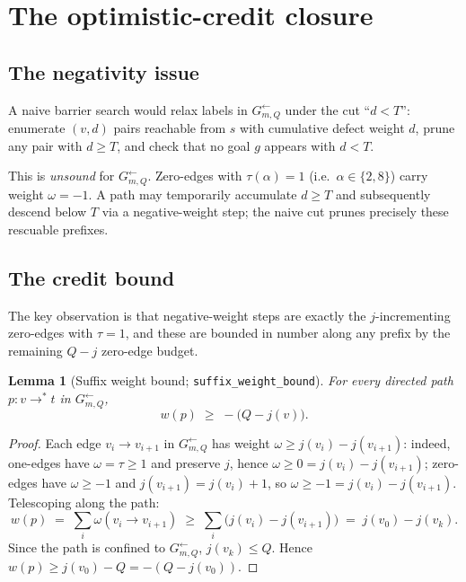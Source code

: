 \documentclass[11pt,a4paper]{article}
\theoremstyle{plain}
\newtheorem{lemma}[theorem]{Lemma}
\theoremstyle{definition}
\newcommand{\InvG}{G^{\!\leftarrow}}
\begin{document}
\section{The optimistic-credit closure}\label{sec:s216-closure}

\subsection{The negativity issue}

A naive barrier search would relax labels in $\InvG_{m, Q}$ under
the cut ``$d < T$'': enumerate $(v, d)$ pairs reachable from $s$
with cumulative defect weight $d$, prune any pair with $d \ge T$,
and check that no goal $g$ appears with $d < T$.

This is \emph{unsound} for $\InvG_{m, Q}$. Zero-edges with
$\tau(\alpha) = 1$ (i.e.\ $\alpha \in \{2, 8\}$) carry weight
$\omega = -1$. A path may temporarily accumulate $d \ge T$ and
subsequently descend below $T$ via a negative-weight step; the
naive cut prunes precisely these rescuable prefixes.

\subsection{The credit bound}

The key observation is that negative-weight steps are exactly the
$j$-incrementing zero-edges with $\tau = 1$, and these are
bounded in number along any prefix by the remaining $Q - j$ zero-edge
budget.

\begin{lemma}[Suffix weight bound; \texttt{suffix\_weight\_bound}]
\label{lem:suffix-bound}
For every directed path $p : v \to^{*} t$ in $\InvG_{m, Q}$,
\[
  w(p) \;\ge\; -\bigl(Q - j(v)\bigr).
\]
\end{lemma}

\begin{proof}
Each edge $v_i \to v_{i+1}$ in $\InvG_{m, Q}$ has weight
$\omega \ge j(v_i) - j(v_{i+1})$: indeed, one-edges have
$\omega = \tau \ge 1$ and preserve $j$, hence
$\omega \ge 0 = j(v_i) - j(v_{i+1})$; zero-edges have
$\omega \ge -1$ and $j(v_{i+1}) = j(v_i) + 1$, so
$\omega \ge -1 = j(v_i) - j(v_{i+1})$. Telescoping along the path:
\[
  w(p) \;=\; \sum_{i} \omega(v_i \to v_{i+1})
       \;\ge\; \sum_i \bigl(j(v_i) - j(v_{i+1})\bigr)
       \;=\; j(v_0) - j(v_k).
\]
Since the path is confined to $\InvG_{m, Q}$, $j(v_k) \le Q$.
Hence $w(p) \ge j(v_0) - Q = -(Q - j(v_0))$.
\end{proof}
\end{document}
